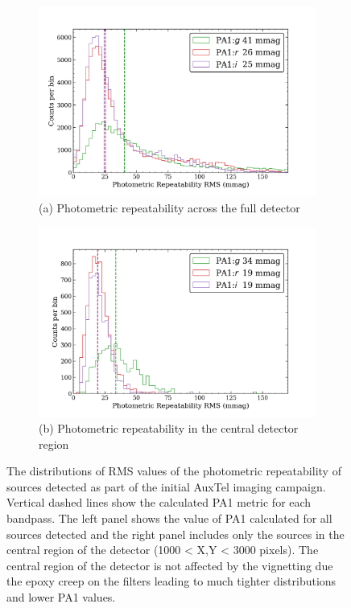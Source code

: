 \begin{figure}[ht]
\begin{subfigure}{.5\textwidth}
    \centering
    \includegraphics[width=1.1\textwidth]{figures/pa1_auxtel}
     \caption[\small]{(a) Photometric repeatability across the full detector}
\end{subfigure}
\begin{subfigure}{.5\textwidth} 
    \centering
    \includegraphics[width=1.1\textwidth]{figures/pa1_auxtel_central}
    \caption[\small]{(b) Photometric repeatability in the central detector region}
\end{subfigure}
\par\medskip 
\caption[short]{\label{fig:faro_auxtel_metrics} 
The distributions of RMS values of the photometric repeatability of sources detected as part of the initial AuxTel imaging campaign. Vertical dashed lines show the calculated PA1 metric for each bandpass. The left panel shows the value of PA1 calculated for all sources detected and the right panel includes only the sources in the central region of the detector (1000 < X,Y < 3000 pixels). The central region of the detector is not affected by the vignetting due the epoxy creep on the filters leading to much tighter distributions and lower PA1 values.}
\end{figure}

